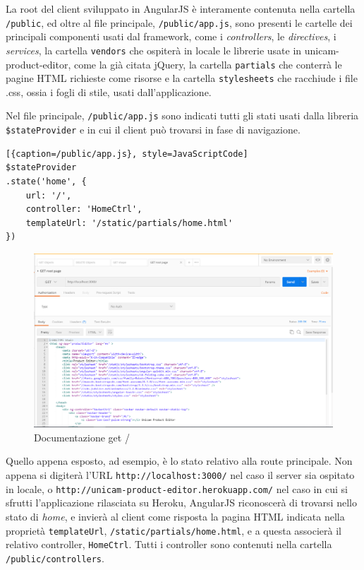 La root del client sviluppato in AngularJS è interamente contenuta nella cartella \texttt{/public}, ed oltre al file principale, \texttt{/public/app.js}, sono presenti le cartelle dei principali componenti usati dal framework, come i \emph{controllers}, le \emph{directives}, i \emph{services}, la cartella \texttt{vendors} che ospiterà in locale le librerie usate in unicam-product-editor, come la già citata jQuery, la cartella \texttt{partials} che conterrà le pagine HTML richieste come risorse e la cartella \texttt{stylesheets} che racchiude i file .css, ossia i fogli di stile, usati dall'applicazione.

Nel file principale, \texttt{/public/app.js} sono indicati tutti gli stati usati dalla libreria \texttt{\$stateProvider} e in cui il client può trovarsi in fase di navigazione.
\begin{lstlisting}[{caption=/public/app.js}, style=JavaScriptCode]
$stateProvider
.state('home', {
	url: '/',
	controller: 'HomeCtrl',
	templateUrl: '/static/partials/home.html'
})
\end{lstlisting}
\begin{figure}[h]
	\centering
	\includegraphics[scale=0.42]{Immagini/get_root.png}
	\caption{Documentazione get /}
\end{figure}

Quello appena esposto, ad esempio, è lo stato relativo alla route principale. Non appena si digiterà l'URL \texttt{http://localhost:3000/} nel caso il server sia ospitato in locale, o \texttt{http://unicam-product-editor.herokuapp.com/} nel caso in cui si sfrutti l'applicazione rilasciata su Heroku, AngularJS riconoscerà di trovarsi nello stato di \emph{home}, e invierà al client come risposta la pagina HTML indicata nella proprietà \texttt{templateUrl}, \texttt{/static/partials/home.html}, e a questa associerà il relativo controller, \texttt{HomeCtrl}. Tutti i controller sono contenuti nella cartella \texttt{/public/controllers}.

